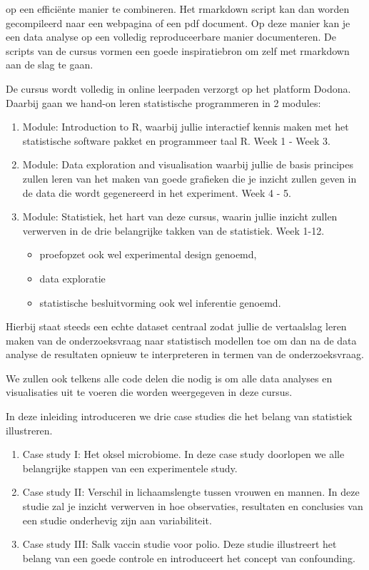 \documentclass[
  12pt,dutch,coursenotes]{book}
\providecommand{\tightlist}{%
  \setlength{\itemsep}{0pt}\setlength{\parskip}{0pt}}
\begin{document}
op een efficiënte manier te combineren. Het rmarkdown script kan dan worden gecompileerd naar een webpagina of een pdf document. Op deze manier kan je een data analyse op een volledig reproduceerbare manier documenteren. De scripts van de cursus vormen een goede inspiratiebron om zelf met rmarkdown aan de slag te gaan.

De cursus wordt volledig in online leerpaden verzorgt op het platform Dodona.
Daarbij gaan we hand-on leren statistische programmeren in 2 modules:

\begin{enumerate}
\def\labelenumi{\arabic{enumi}.}
\item
  Module: Introduction to R, waarbij jullie interactief kennis maken met het statistische software pakket en programmeer taal R. Week 1 - Week 3.
\item
  Module: Data exploration and visualisation waarbij jullie de basis principes zullen leren van het maken van goede grafieken die je inzicht zullen geven in de data die wordt gegenereerd in het experiment. Week 4 - 5.
\item
  Module: Statistiek, het hart van deze cursus, waarin jullie inzicht zullen verwerven in de drie belangrijke takken van de statistiek. Week 1-12.

  \begin{itemize}
  \tightlist
  \item
    proefopzet ook wel experimental design genoemd,
  \item
    data exploratie
  \item
    statistische besluitvorming ook wel inferentie genoemd.
  \end{itemize}
\end{enumerate}

Hierbij staat steeds een echte dataset centraal zodat jullie de vertaalslag leren maken van de onderzoeksvraag naar statistisch modellen toe om dan na de data analyse de resultaten opnieuw te interpreteren in termen van de onderzoeksvraag.

We zullen ook telkens alle code delen die nodig is om alle data analyses en visualisaties uit te voeren die worden weergegeven in deze cursus.

In deze inleiding introduceren we drie case studies die het belang van statistiek illustreren.

\begin{enumerate}
\def\labelenumi{\arabic{enumi}.}
\item
  Case study I: Het oksel microbiome. In deze case study doorlopen we alle belangrijke stappen van een experimentele study.
\item
  Case study II: Verschil in lichaamslengte tussen vrouwen en mannen. In deze studie zal je inzicht verwerven in hoe observaties, resultaten en conclusies van een studie onderhevig zijn aan variabiliteit.
\item
  Case study III: Salk vaccin studie voor polio. Deze studie illustreert het belang van een goede controle en introduceert het concept van confounding.
\end{enumerate}
\end{document}

